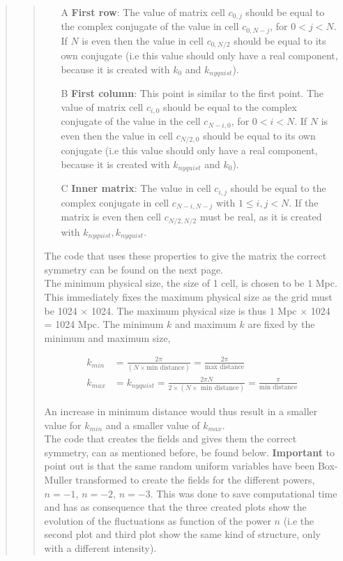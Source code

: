 \begin{quote}
\begin{quote}
\begin{enumerate}
\item[A] \textbf{First row}: The value of matrix cell $c_{0,j}$ should be equal to the complex conjugate of the value in cell $c_{0,N-j}$, for $ 0 < j< N$. If $N$ is even then  the  value in cell $c_{0,N/2}$ should be equal to its own conjugate (i.e this value should only have a real component, because it is created with $k_0$ and $k_{nyquist}$).
\item[B] \textbf{First column}: This point is similar to the first point. The value of matrix cell $c_{i,0}$ should be equal to the complex conjugate of the value in the cell $c_{N-i,0}$, for $0 < i < N$. If $N$ is even then the value in cell $c_{N/2,0}$ should be equal to its own conjugate (i.e this value should only have a real component, because it is created with $k_{nyquist}$ and $k_{0}$).
\item[C] \textbf{Inner matrix}: The value in cell $c_{i,j}$ should be equal to the complex conjugate in cell $c_{N-i,N-j}$ with $1 \leq i, j < N$. If the matrix is even then cell $c_{N/2,N/2}$ must be real, as it is created with $k_{nyquist}, k_{nyquist}$. %
\end{enumerate}
The code that uses these properties to give the matrix the correct symmetry can be found on the next page. 
\\

The minimum physical size, the size of 1 cell, is chosen to be $ 1$ Mpc. This immediately fixes the maximum physical size as the grid must be 1024 $\times$ 1024. The maximum physical size is thus $ 1$ Mpc $ \times $ 1024 = 1024 Mpc. The minimum $k$ and maximum $k$ are fixed by the minimum and maximum size,

\begin{align}
k_{min} &= \frac{2 \pi}{ ( N \times \text{min distance} )} = \frac{2 \pi }{\text{max distance}} \\
k_{max} &= k_{nyquist} = \frac{2 \pi N}{ 2 \times ( N \times \text{ min distance} )} = \frac{ \pi}{\text{min distance}}
\end{align}

An increase in minimum distance would thus result in a smaller value for $k_{min}$ and a smaller value of $k_{max}$.
\\

The code that creates the fields and gives them the correct symmetry, can as mentioned before, be found below. \textbf{Important} to point out is that the same random uniform variables have been Box-Muller transformed to create the fields for the different powers, $n = -1$, $n = -2$, $n = -3$. This was done to save computational time and has as consequence that the three created plots show the evolution of the fluctuations as function of the power $n$ (i.e the second plot and third plot show the same kind of structure, only with a different intensity).


\end{quote}
\end{quote}
